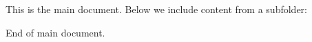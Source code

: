 \documentclass{article}
\begin{document}
This is the main document.
Below we include content from a subfolder:



End of main document.
\end{document}
